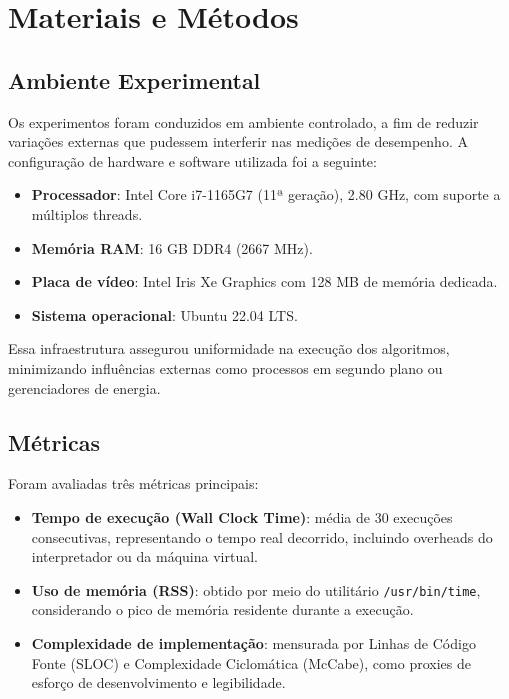 \documentclass[12pt, a4paper]{article}
\begin{document}
\section{Materiais e Métodos}

\subsection{Ambiente Experimental}

Os experimentos foram conduzidos em ambiente controlado, a fim de reduzir variações externas que pudessem interferir nas medições de desempenho. A configuração de hardware e software utilizada foi a seguinte:

\begin{itemize}
    \item \textbf{Processador}: Intel Core i7-1165G7 (11ª geração), 2.80 GHz, com suporte a múltiplos threads.
    \item \textbf{Memória RAM}: 16 GB DDR4 (2667 MHz).
    \item \textbf{Placa de vídeo}: Intel Iris Xe Graphics com 128 MB de memória dedicada.
    \item \textbf{Sistema operacional}: Ubuntu 22.04 LTS.
\end{itemize}

Essa infraestrutura assegurou uniformidade na execução dos algoritmos, minimizando influências externas como processos em segundo plano ou gerenciadores de energia.

\subsection{Métricas}

Foram avaliadas três métricas principais:

\begin{itemize}
    \item \textbf{Tempo de execução (Wall Clock Time)}: média de 30 execuções consecutivas, representando o tempo real decorrido, incluindo overheads do interpretador ou da máquina virtual.
    \item \textbf{Uso de memória (RSS)}: obtido por meio do utilitário \texttt{/usr/bin/time}, considerando o pico de memória residente durante a execução.
    \item \textbf{Complexidade de implementação}: mensurada por Linhas de Código Fonte (SLOC) e Complexidade Ciclomática (McCabe), como proxies de esforço de desenvolvimento e legibilidade.
\end{itemize}
\end{document}
